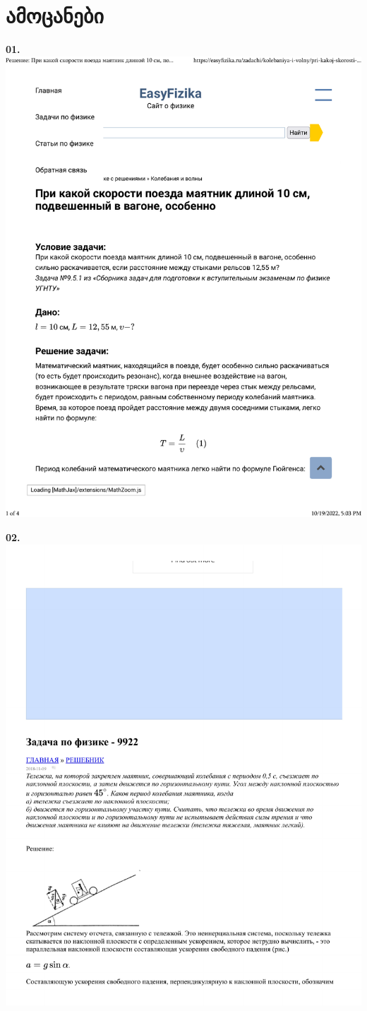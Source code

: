 \documentclass{book}
\begin{document}
\section{ამოცანები}
\textbf{01.}
\includegraphics[width=0.9\columnwidth]{temp_pdfs/1.pdf}

\textbf{02.}
\includegraphics[width=0.9\columnwidth]{temp_pdfs/2.pdf}
\end{document}
